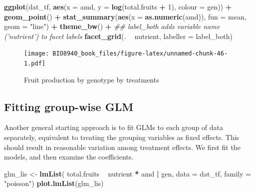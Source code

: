 \documentclass[
  12pt,
]{book}
\newenvironment{Shaded}{\begin{snugshade}}{\end{snugshade}}
\newcommand{\CommentTok}[1]{\textcolor[rgb]{0.56,0.35,0.01}{\textit{#1}}}
\newcommand{\DataTypeTok}[1]{\textcolor[rgb]{0.13,0.29,0.53}{#1}}
\newcommand{\DecValTok}[1]{\textcolor[rgb]{0.00,0.00,0.81}{#1}}
\newcommand{\KeywordTok}[1]{\textcolor[rgb]{0.13,0.29,0.53}{\textbf{#1}}}
\newcommand{\NormalTok}[1]{#1}
\newcommand{\OperatorTok}[1]{\textcolor[rgb]{0.81,0.36,0.00}{\textbf{#1}}}
\newcommand{\StringTok}[1]{\textcolor[rgb]{0.31,0.60,0.02}{#1}}
\begin{document}
\begin{Shaded}
\begin{Highlighting}[]
\KeywordTok{ggplot}\NormalTok{(dat_tf, }\KeywordTok{aes}\NormalTok{(}\DataTypeTok{x =}\NormalTok{ amd, }\DataTypeTok{y =} \KeywordTok{log}\NormalTok{(total.fruits }\OperatorTok{+}\StringTok{ }\DecValTok{1}\NormalTok{), }\DataTypeTok{colour =}\NormalTok{ gen)) }\OperatorTok{+}
\StringTok{  }\KeywordTok{geom_point}\NormalTok{() }\OperatorTok{+}
\StringTok{  }\KeywordTok{stat_summary}\NormalTok{(}\KeywordTok{aes}\NormalTok{(}\DataTypeTok{x =} \KeywordTok{as.numeric}\NormalTok{(amd)), }\DataTypeTok{fun =}\NormalTok{ mean, }\DataTypeTok{geom =} \StringTok{"line"}\NormalTok{) }\OperatorTok{+}
\StringTok{  }\KeywordTok{theme_bw}\NormalTok{() }\OperatorTok{+}
\StringTok{  }\CommentTok{## label_both adds variable name ('nutrient') to facet labels}
\StringTok{  }\KeywordTok{facet_grid}\NormalTok{(. }\OperatorTok{~}\StringTok{ }\NormalTok{nutrient, }\DataTypeTok{labeller =}\NormalTok{ label_both)}
\end{Highlighting}
\end{Shaded}

\begin{figure}
\centering
\texttt{[image: BIO8940\_book\_files/figure-latex/unnamed-chunk-46-1.pdf]}
\caption{\label{fig:unnamed-chunk-46}Fruit production by genotype by treatments}
\end{figure}

\hypertarget{fitting-group-wise-glm}{%
\subsection{Fitting group-wise GLM}\label{fitting-group-wise-glm}}

Another general starting approach is to fit GLMs to each group of data separately, equivalent to treating the grouping variables as fixed effects.
This should result in reasonable variation among treatment effects. We first fit the models, and then examine the coefficients.

\begin{Shaded}
\begin{Highlighting}[]
\NormalTok{glm_lis <-}\StringTok{ }\KeywordTok{lmList}\NormalTok{(}
\NormalTok{  total.fruits }\OperatorTok{~}\StringTok{ }\NormalTok{nutrient }\OperatorTok{*}\StringTok{ }\NormalTok{amd }\OperatorTok{|}\StringTok{ }\NormalTok{gen,}
  \DataTypeTok{data =}\NormalTok{ dat_tf,}
  \DataTypeTok{family =} \StringTok{"poisson"}\NormalTok{)}
\KeywordTok{plot.lmList}\NormalTok{(glm_lis)}
\end{Highlighting}
\end{Shaded}
\end{document}
